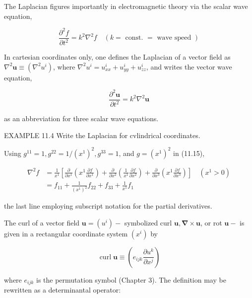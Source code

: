 \documentclass[10pt]{article}
\begin{document}
The Laplacian figures importantly in electromagnetic theory via the scalar wave equation,


\begin{equation*}
\frac{\partial^{2} f}{\partial t^{2}}=k^{2} \nabla^{2} f \quad(k=\text { const. }=\text { wave speed }) \tag{11.16a}
\end{equation*}


In cartesian coordinates only, one defines the Laplacian of a vector field as $\nabla^{2} \mathbf{u} \equiv\left(\nabla^{2} u^{i}\right)$, where $\nabla^{2} u^{i}=u_{x x}^{i}+u_{y y}^{i}+u_{z z}^{i}$, and writes the vector wave equation,


\begin{equation*}
\frac{\partial^{2} \mathbf{u}}{\partial t^{2}}=k^{2} \nabla^{2} \mathbf{u} \tag{11.16b}
\end{equation*}


as an abbreviation for three scalar wave equations.

EXAMPLE 11.4 Write the Laplacian for cvlindrical coordinates.

Using $g^{11}=1, g^{22}=1 /\left(x^{1}\right)^{2}, g^{33}=1$, and $g=\left(x^{1}\right)^{2}$ in (11.15),

$$
\begin{aligned}
\nabla^{2} f & =\frac{1}{x^{1}}\left[\frac{\partial}{\partial x^{1}}\left(x^{1} \frac{\partial f}{\partial x^{1}}\right)+\frac{\partial}{\partial x^{2}}\left(\frac{1}{x^{1}} \frac{\partial f}{\partial x^{2}}\right)+\frac{\partial}{\partial x^{3}}\left(x^{1} \frac{\partial f}{\partial x^{3}}\right)\right] \quad\left(x^{1}>0\right) \\
& =f_{11}+\frac{1}{\left(x^{1}\right)^{2}} f_{22}+f_{33}+\frac{1}{x^{1}} f_{1}
\end{aligned}
$$

the last line employing subscript notation for the partial derivatives.

The curl of a vector field $\mathbf{u}=\left(u^{i}\right)-$ symbolized curl $\mathbf{u}, \boldsymbol{\nabla} \times \mathbf{u}$, or rot $\mathbf{u}-$ is given in a rectangular coordinate system $\left(x^{i}\right)$ by


\begin{equation*}
\operatorname{curl} \mathbf{u} \equiv\left(e_{i j k} \frac{\partial u^{k}}{\partial x^{j}}\right) \tag{11.17a}
\end{equation*}


where $e_{i j k}$ is the permutation symbol (Chapter 3). The definition may be rewritten as a determinantal operator:
\end{document}
